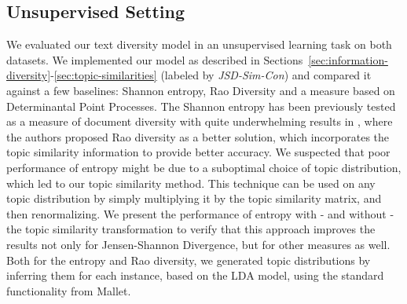 \subsection{Unsupervised Setting}
\label{sec:unsupervised-learning}

We evaluated our text diversity model in an unsupervised learning task
on both datasets.
We implemented our model as described in
Sections~\ref{sec:information-diversity}-\ref{sec:topic-similarities} (labeled by {\em
    JSD-Sim-Con}) and compared it against a few 
baselines: Shannon entropy, Rao Diversity and a measure
based on Determinantal Point Processes.
The Shannon entropy has
been previously tested as a measure of document diversity with quite
underwhelming results in \cite{bache:2013}, where the authors proposed 
Rao diversity as a better solution, which incorporates the topic similarity
information to provide better accuracy. We suspected that
poor performance of entropy might be due to a suboptimal choice of
topic distribution, which led to our topic similarity
method. This technique can be used on any topic distribution
by simply multiplying it by the topic similarity matrix, and then
renormalizing. We present the performance of entropy with - and
without - the topic
similarity transformation to verify that this approach improves the results not
only for Jensen-Shannon Divergence, but for other measures as well.
Both for the entropy and Rao diversity, we generated topic
distributions by inferring them for each instance, based on the LDA
model, using the standard functionality from Mallet.

